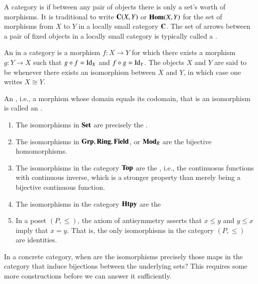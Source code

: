 \documentclass[12pt, a4paper, oneside, openright, titlepage]{book}
\begin{document}
\begin{defn}
    A category is  if between any pair of objects there is only a set's worth of morphisms. It is traditional to write $\normalfont\textbf{C}(X,Y)$ or $\mathbf{Hom}(X,Y)$ for the set of morphisms from $X$ to $Y$ in a locally small category $\normalfont\textbf{C}$. The set of arrows between a pair of fixed objects in a locally small category is typically called a .
\end{defn}


\begin{defn}
    An  in a category is a morphism $f:X\rightarrow Y$ for which there exists a morphism $g:Y\rightarrow X$ such that $g\circ f = \operatorname{Id}_X$ and $f\circ g = \operatorname{Id}_Y$. The objects $X$ and $Y$ are said to be  whenever there exists an isomorphism between $X$ and $Y$, in which case one writes $X\cong Y$.
\end{defn}

\begin{defn}
    An , i.e., a morphism whose domain equals its codomain, that is an isomorphism is called an .
\end{defn}


\begin{eg}
    \leavevmode
    \begin{enumerate}
        \item The isomorphisms in $\normalfont\textbf{Set}$ are precisely the .
        \item The isomorphisms in $\normalfont\textbf{Grp}, \normalfont\textbf{Ring}, \normalfont\textbf{Field}$, or $\normalfont\textbf{Mod}_R$ are the bijective homomorphisms.
        \item The isomorphisms in the category $\normalfont\textbf{Top}$ are the , i.e., the continuosus functions with continuous inverse, which is a stronger property than merely being a bijective continuous function.
        \item The isomorphisms in the category $\normalfont\textbf{Htpy}$ are the 
        \item In a poset $(P,\leq)$, the axiom of antisymmetry asserts that $x\leq y$ and $y\leq x$ imply that $x = y$. That is, the only isomorphisms in the category $(P,\leq)$ are identities.
    \end{enumerate}
\end{eg}

\begin{qest}
    In a concrete category, when are the isomorphisms precisely those maps in the category that induce bijections between the underlying sets? This requires some more constructions before we can answer it sufficiently.
\end{qest}
\end{document}
